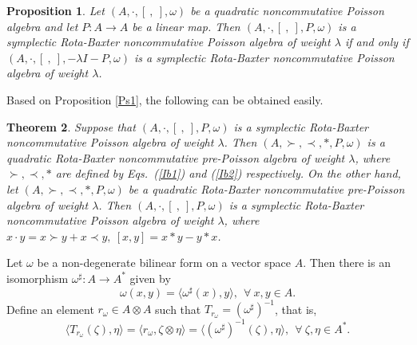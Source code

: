 \documentclass[12pt]{amsart}
\newtheorem{thm}{Theorem}[section]
\newtheorem{pro}[thm]{Proposition}
\theoremstyle{definition}
\begin{document}
\begin{pro} Let $(A,\cdot,[ \ , \ ],\omega)$ be a quadratic noncommutative Poisson algebra and let $P:A\longrightarrow A$ be a linear
map. Then $(A,\cdot,[ \ , \ ] ,P,\omega)$ is a symplectic Rota-Baxter noncommutative Poisson algebra of weight $\lambda$ if and only if
$(A,\cdot,[ \ , \ ],-\lambda I-P,\omega)$ is a symplectic Rota-Baxter noncommutative Poisson algebra of weight $\lambda$.
\end{pro}


Based on Proposition \ref{Ps1}, the following can be obtained easily.

\begin{thm}\label{Fb0} Suppose that $(A,\cdot,[ \ , \ ],P,\omega)$ is a symplectic Rota-Baxter noncommutative Poisson algebra of 
weight $\lambda$. Then $(A,\succ,\prec,\ast,P,\omega)$ is a quadratic Rota-Baxter noncommutative pre-Poisson
algebra of weight $\lambda$, where $\succ,\prec,\ast$ are defined by Eqs.~(\ref{Ib1}) and (\ref{Ib2}) respectively.
 On the other hand, let $(A,\succ,\prec,\ast,P,\omega)$ be a quadratic Rota-Baxter noncommutative pre-Poisson algebra of weight $\lambda$.
Then $(A,\cdot,[ \ , \ ],P,\omega)$ is a symplectic Rota-Baxter noncommutative Poisson algebra
 of weight $\lambda$, where $x\cdot y=x\succ y+x\prec y,~[x,y]=x\ast y-y\ast x$.
\end{thm}

Let $\omega$ be a non-degenerate bilinear form on a vector space $A$. Then there is an isomorphism
$\omega^{\sharp}:A\longrightarrow A^{*}$ given by
\begin{equation} \omega(x,y)=\langle\omega^{\sharp}(x),y \rangle,~~\forall~x,y\in A.\end{equation}
Define an element $r_{\omega}\in A\otimes A$ such that $T_{r_{\omega}}=(\omega^{\sharp})^{-1}$,
that is, 
\begin{equation}\label{Nd1} \langle T_{r_{\omega}}(\zeta),\eta\rangle=\langle r_{\omega},\zeta \otimes\eta\rangle=
\langle (\omega^{\sharp})^{-1}(\zeta), \eta\rangle, \ \ \forall~\zeta,\eta\in A^{*}. \end{equation}
\end{document}
